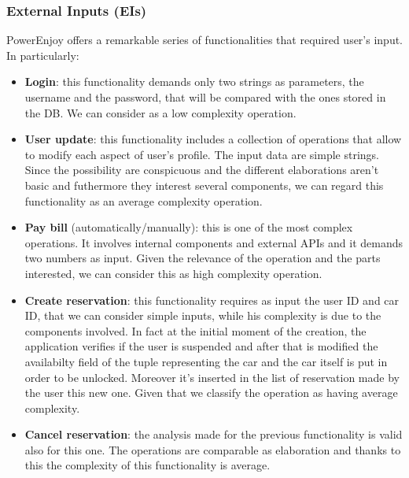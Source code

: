 \documentclass[english]{article}
\begin{document}
\subsubsection{External Inputs (EIs)}

PowerEnjoy offers a remarkable series of functionalities that required user's input.\\
In particularly:

\begin{itemize}

	\item{\textbf{Login}: this functionality demands only two strings as parameters, the username and the password, that will be compared with the ones stored in the DB. We can consider as a low complexity operation.}
	
	\item{\textbf{User update}: this functionality includes a collection of operations that allow to modify each aspect of user's profile. The input data are simple strings. Since the possibility are conspicuous and the different elaborations aren't basic and futhermore they interest several components, we can regard this functionality as an average complexity operation.}
	
	\item{\textbf{Pay bill} (automatically/manually): this is one of the most complex operations. It involves internal components and external APIs and it demands two numbers as input. Given the relevance of the operation and the parts interested, we can consider this as high complexity operation.}

	\item{\textbf{Create reservation}: this functionality requires as input the user ID and car ID, that we can consider simple inputs, while his complexity is due to the components involved. In fact at the initial moment of the creation, the application verifies if the user is suspended and after that is modified the availabilty field of the tuple representing the car and the car itself is put in order to be unlocked. Moreover it's inserted in the list of reservation made by the user this new one. Given that we classify the operation as having average complexity.}

	\item{\textbf{Cancel reservation}: the analysis made for the previous functionality is valid also for this one. The operations are comparable as elaboration and thanks to this the complexity of this functionality is average.}


\end{itemize}
\end{document}

